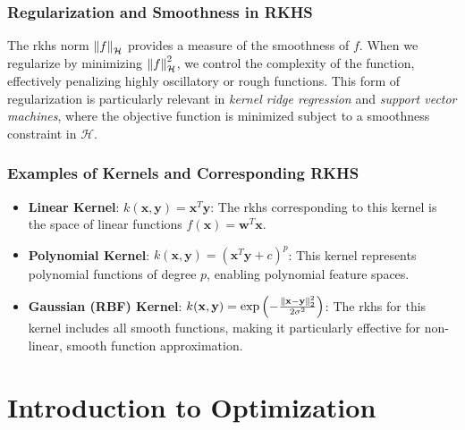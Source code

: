 \subsubsection{Regularization and Smoothness in RKHS}

The \ac{rkhs} norm $\norm{f}_{\mathcal{H}}$ provides a measure of the smoothness of $f$. When we regularize by minimizing $\norm{f}_{\mathcal{H}}^2$, we control the complexity of the function, effectively penalizing highly oscillatory or rough functions. This form of regularization is particularly relevant in \textit{kernel ridge regression} and \textit{support vector machines}, where the objective function is minimized subject to a smoothness constraint in $\mathcal{H}$.

\subsubsection{Examples of Kernels and Corresponding RKHS}

\begin{itemize}
    \item \textbf{Linear Kernel}: $k(\mathbf{x}, \mathbf{y}) = \mathbf{x}^T \mathbf{y}$: The \ac{rkhs} corresponding to this kernel is the space of linear functions $f(\mathbf{x}) = \mathbf{w}^T \mathbf{x}$.
    \item \textbf{Polynomial Kernel}: $k(\mathbf{x}, \mathbf{y}) = (\mathbf{x}^T \mathbf{y} + c)^p$: This kernel represents polynomial functions of degree $p$, enabling polynomial feature spaces.
    \item \textbf{Gaussian (RBF) Kernel}: $k(\mathbf{x}, \mathbf{y}) = \exp\left(-\frac{\norm{\mathbf{x} - \mathbf{y}}_2^2}{2\sigma^2}\right)$: The \ac{rkhs} for this kernel includes all smooth functions, making it particularly effective for non-linear, smooth function approximation.  
\end{itemize}


\section{Introduction to Optimization}
\label{section:optimization_introduction}

